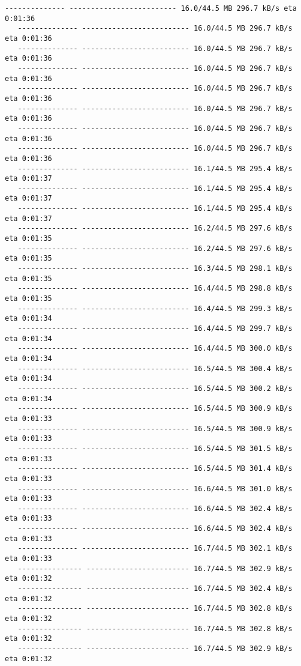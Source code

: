 \documentclass[11pt]{article}
\begin{document}
\begin{Verbatim}[commandchars=\\\{\}]
   -------------- ------------------------- 16.0/44.5 MB 296.7 kB/s eta 0:01:36
   -------------- ------------------------- 16.0/44.5 MB 296.7 kB/s eta 0:01:36
   -------------- ------------------------- 16.0/44.5 MB 296.7 kB/s eta 0:01:36
   -------------- ------------------------- 16.0/44.5 MB 296.7 kB/s eta 0:01:36
   -------------- ------------------------- 16.0/44.5 MB 296.7 kB/s eta 0:01:36
   -------------- ------------------------- 16.0/44.5 MB 296.7 kB/s eta 0:01:36
   -------------- ------------------------- 16.0/44.5 MB 296.7 kB/s eta 0:01:36
   -------------- ------------------------- 16.0/44.5 MB 296.7 kB/s eta 0:01:36
   -------------- ------------------------- 16.1/44.5 MB 295.4 kB/s eta 0:01:37
   -------------- ------------------------- 16.1/44.5 MB 295.4 kB/s eta 0:01:37
   -------------- ------------------------- 16.1/44.5 MB 295.4 kB/s eta 0:01:37
   -------------- ------------------------- 16.2/44.5 MB 297.6 kB/s eta 0:01:35
   -------------- ------------------------- 16.2/44.5 MB 297.6 kB/s eta 0:01:35
   -------------- ------------------------- 16.3/44.5 MB 298.1 kB/s eta 0:01:35
   -------------- ------------------------- 16.4/44.5 MB 298.8 kB/s eta 0:01:35
   -------------- ------------------------- 16.4/44.5 MB 299.3 kB/s eta 0:01:34
   -------------- ------------------------- 16.4/44.5 MB 299.7 kB/s eta 0:01:34
   -------------- ------------------------- 16.4/44.5 MB 300.0 kB/s eta 0:01:34
   -------------- ------------------------- 16.5/44.5 MB 300.4 kB/s eta 0:01:34
   -------------- ------------------------- 16.5/44.5 MB 300.2 kB/s eta 0:01:34
   -------------- ------------------------- 16.5/44.5 MB 300.9 kB/s eta 0:01:33
   -------------- ------------------------- 16.5/44.5 MB 300.9 kB/s eta 0:01:33
   -------------- ------------------------- 16.5/44.5 MB 301.5 kB/s eta 0:01:33
   -------------- ------------------------- 16.5/44.5 MB 301.4 kB/s eta 0:01:33
   -------------- ------------------------- 16.6/44.5 MB 301.0 kB/s eta 0:01:33
   -------------- ------------------------- 16.6/44.5 MB 302.4 kB/s eta 0:01:33
   -------------- ------------------------- 16.6/44.5 MB 302.4 kB/s eta 0:01:33
   -------------- ------------------------- 16.7/44.5 MB 302.1 kB/s eta 0:01:33
   --------------- ------------------------ 16.7/44.5 MB 302.9 kB/s eta 0:01:32
   --------------- ------------------------ 16.7/44.5 MB 302.4 kB/s eta 0:01:32
   --------------- ------------------------ 16.7/44.5 MB 302.8 kB/s eta 0:01:32
   --------------- ------------------------ 16.7/44.5 MB 302.8 kB/s eta 0:01:32
   --------------- ------------------------ 16.7/44.5 MB 302.9 kB/s eta 0:01:32

\end{Verbatim}
\end{document}
